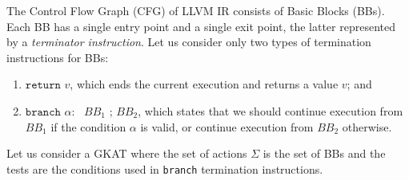 The Control Flow Graph (CFG) of LLVM IR consists of Basic Blocks (BBs). Each BB has a single entry point and a single exit point, the latter represented by a \emph{terminator instruction}. Let us consider only two types of termination instructions for BBs:
\begin{enumerate}
\item $\texttt{return }v$, which ends the current execution and returns a value $v$; and
\item $\texttt{branch $\alpha:$ $BB_1$ ; $BB_2$}$, which states that we should continue execution from $BB_1$ if the condition $\alpha$ is valid, or continue execution from $BB_2$ otherwise.
\end{enumerate}
Let us consider a GKAT where the set of actions $\Sigma$ is the set of BBs and the tests are the conditions used in \texttt{branch} termination instructions.







